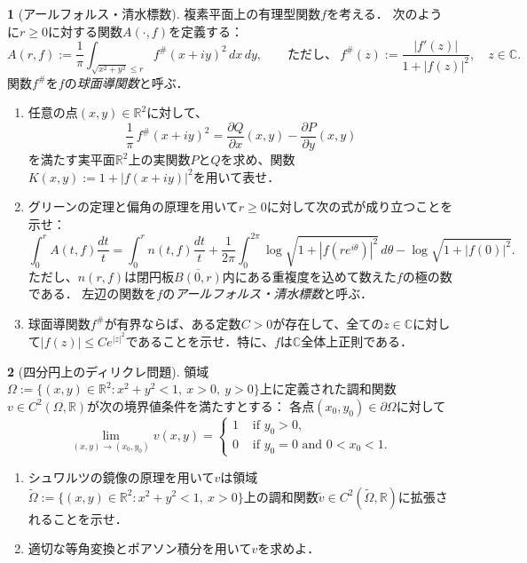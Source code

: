 \documentclass[a4paper]{article}
\theoremstyle{definition}
\newtheorem{prb}{}
\newcommand{\C}{\mathbb{C}}
\newcommand{\R}{\mathbb{R}}
\renewcommand{\tilde}{\widetilde}
\renewcommand{\bar}{\overline}
\begin{document}
\begin{prb}[アールフォルス・清水標数]
複素平面上の有理型関数$f$を考える．
次のように$r\ge0$に対する関数$A(\cdot,f)$を定義する：
\[A(r,f):=\frac1\pi\int_{\sqrt{x^2+y^2}\le r}f^\#(x+iy)^2\,dx\,dy,\qquad\text{ただし、}\ f^\#(z):=\frac{|f'(z)|}{1+|f(z)|^2},\quad z\in\C.\]
関数$f^\#$を$f$の\emph{球面導関数}と呼ぶ．
\begin{enumerate}[label=(\arabic*)]
\item 任意の点$(x,y)\in\R^2$に対して、
\[\frac1\pi\,f^\#(x+iy)^2=\frac{\partial Q}{\partial x}(x,y)-\frac{\partial P}{\partial y}(x,y)\]
を満たす実平面$\R^2$上の実関数$P$と$Q$を求め、関数$K(x,y):=1+|f(x+iy)|^2$を用いて表せ．
\item グリーンの定理と偏角の原理を用いて$r\ge0$に対して次の式が成り立つことを示せ：
\[\int_0^rA(t,f)\frac{dt}t=\int_0^rn(t,f)\frac{dt}t+\frac1{2\pi}\int_0^{2\pi}\log\sqrt{1+|f(re^{i\theta})|^2}\,d\theta-\log\sqrt{1+|f(0)|^2}.\]
ただし、$n(r,f)$は閉円板$\bar{B(0,r)}$内にある重複度を込めて数えた$f$の極の数である．
左辺の関数を$f$の\emph{アールフォルス・清水標数}と呼ぶ．
\item 球面導関数$f^\#$が有界ならば、ある定数$C>0$が存在して、全ての$z\in\C$に対して$|f(z)|\le Ce^{|z|^2}$であることを示せ．特に、$f$は$\C$全体上正則である．
\end{enumerate}
\end{prb}

\begin{prb}[四分円上のディリクレ問題]
領域$\Omega:=\{(x,y)\in\R^2:x^2+y^2<1,\ x>0,\ y>0\}$上に定義された調和関数$v\in C^2(\Omega,\R)$が次の境界値条件を満たすとする：
各点$(x_0,y_0)\in\partial\Omega$に対して
\[\lim_{(x,y)\to(x_0,y_0)}v(x,y)=\begin{cases}
1&\text{ if }y_0>0,\\
0&\text{ if }y_0=0\text{ and }0<x_0<1.
\end{cases}\]
\begin{enumerate}[label=(\arabic*)]
\item シュワルツの鏡像の原理を用いて$v$は領域$\tilde\Omega:=\{(x,y)\in\R^2:x^2+y^2<1,\ x>0\}$上の調和関数$\tilde v\in C^2(\tilde\Omega,\R)$に拡張されることを示せ．
\item 適切な等角変換とポアソン積分を用いて$v$を求めよ．
\end{enumerate}
\end{prb}


\newpage
\end{document}
